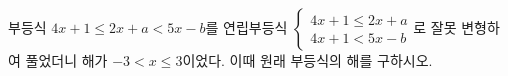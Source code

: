 부등식 $4x+1\le 2x+a<5x-b$를 연립부등식 $\begin{cases} 4x+1\le 2x+a \\ 4x+1<5x-b \end{cases}$로 잘못 변형하여 풀었더니 해가 $-3<x\le 3$이었다. 이때 원래 부등식의 해를 구하시오. 
